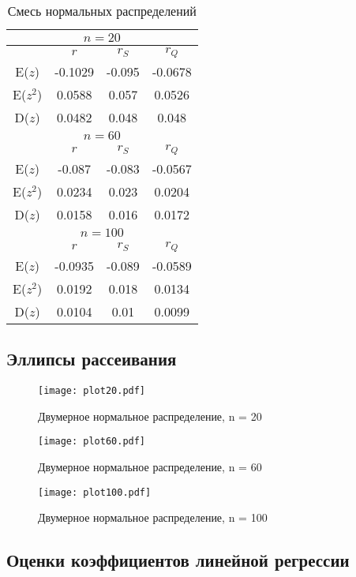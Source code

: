 \documentclass[a4paper,12pt]{article} %
\begin{document}
\begin{table}[H]
    \centering
\begin{tabular}{|c|c|c|c|}
\hline
\multicolumn{4}{|c|}{$n=20$}\\
\hline
&$r$&$r_S$&$r_Q$\\
\hline
E($z$)&-0.1029&-0.095&-0.0678\\
\hline
E($z^2$)&0.0588&0.057&0.0526\\
\hline
D($z$)&0.0482&0.048&0.048\\
\hline
\multicolumn{4}{|c|}{$n=60$}\\
\hline
&$r$&$r_S$&$r_Q$\\
\hline
E($z$)&-0.087&-0.083&-0.0567\\
\hline
E($z^2$)&0.0234&0.023&0.0204\\
\hline
D($z$)&0.0158&0.016&0.0172\\
\hline
\multicolumn{4}{|c|}{$n=100$}\\
\hline
&$r$&$r_S$&$r_Q$\\
\hline
E($z$)&-0.0935&-0.089&-0.0589\\
\hline
E($z^2$)&0.0192&0.018&0.0134\\
\hline
D($z$)&0.0104&0.01&0.0099\\
\hline
\end{tabular}
    \caption{Смесь нормальных распределений}
    \label{tab:norm_mix}
\end{table}
\subsection{Эллипсы рассеивания}
\begin{figure}[H]
    \centering
    \texttt{[image: plot20.pdf]}
    \caption{Двумерное нормальное распределение, n = 20}
    \label{fig:n20}
\end{figure}
\begin{figure}[H]
    \centering
    \texttt{[image: plot60.pdf]}
    \caption{Двумерное нормальное распределение, n = 60}
    \label{fig:n60}
\end{figure}
\begin{figure}[H]
    \centering
    \texttt{[image: plot100.pdf]}
    \caption{Двумерное нормальное распределение, n = 100}
    \label{fig:n100}
\end{figure}
\subsection{Оценки коэффициентов линейной регрессии}
\end{document}
